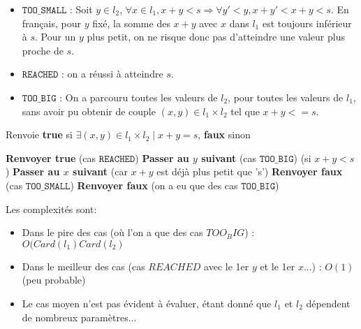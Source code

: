 \documentclass[10pt]{article}
\begin{document}
				\begin{itemize}[label=-]
					\setlength\itemsep{0.1em}
					\item $\mathtt{TOO\_SMALL}$ : Soit $y \in l_2$, $\forall x \in l_1, x + y < s \Rightarrow \forall y' < y, x + y' < x + y < s$.
					En français, pour $y$ fixé, la somme des $x + y$ avec $x$ dans $l_1$ est toujours inférieur à $s$.
					Pour un $y$ plus petit, on ne risque donc pas d'atteindre une valeur plus proche de $s$.
					\item $\mathtt{REACHED}$ : on a réussi à atteindre $s$.
					\item $\mathtt{TOO\_BIG}$ : On a parcouru toutes les valeurs de $l_2$, pour toutes les valeurs de $l_1$,
					sans avoir pu obtenir de couple $(x, y) \in l_1 \times l_2$ tel que $x + y <= s$.
				\end{itemize}
				
				\begin{algorithm}
					\caption{Renvoie \textbf{true} si $\exists (x, y) \in l_1 \times l_2 \mid x + y = s$, \textbf{faux} sinon}
					\begin{algorithmic}[1]
										\State \textbf{Renvoyer true} (cas $\mathtt{REACHED}$)
										\State \textbf{Passer au $y$ suivant} (cas $\mathtt{TOO\_BIG}$)
									\Else (si $x + y < s$)
										\State \textbf{Passer au $x$ suivant} (car $x + y$ est déjà plus petit que 's')
									\EndIf
								\EndFor
								\State \textbf{Renvoyer faux} (cas $\mathtt{TOO\_SMALL}$)
							\EndFor
							\State \textbf{Renvoyer faux} (on a eu que des cas $\mathtt{TOO\_BIG}$)
						\EndFunction
					\end{algorithmic}
				\end{algorithm}
				
				Les complexités sont:
				\begin{itemize}[label=-]
					\setlength\itemsep{0.1em}
					\item Dans le pire des cas (où l'on a que des cas $TOO_BIG$) : $O(Card(l_1)Card(l_2)$
					\item Dans le meilleur des cas (cas $REACHED$ avec le 1er $y$ et le 1er $x$...) : $O(1)$ (peu probable)
					\item Le cas moyen n'est pas évident à évaluer, étant donné que $l_1$ et $l_2$ dépendent de nombreux paramètres...
				\end{itemize}
\end{document}

